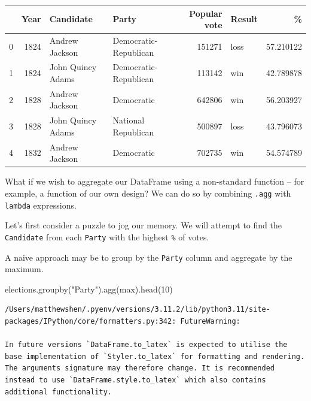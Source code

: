 \documentclass[
  letterpaper,
  DIV=11,
  numbers=noendperiod]{scrreprt}
\newenvironment{Shaded}{\begin{snugshade}}{\end{snugshade}}
\newcommand{\BuiltInTok}[1]{\textcolor[rgb]{0.00,0.23,0.31}{#1}}
\newcommand{\DecValTok}[1]{\textcolor[rgb]{0.68,0.00,0.00}{#1}}
\newcommand{\NormalTok}[1]{\textcolor[rgb]{0.00,0.23,0.31}{#1}}
\newcommand{\StringTok}[1]{\textcolor[rgb]{0.13,0.47,0.30}{#1}}
\begin{document}
\begin{tabular}{lrllrlr}
\toprule
{} &  Year &          Candidate &                  Party &  Popular vote & Result &          \% \\
\midrule
0 &  1824 &     Andrew Jackson &  Democratic-Republican &        151271 &   loss &  57.210122 \\
1 &  1824 &  John Quincy Adams &  Democratic-Republican &        113142 &    win &  42.789878 \\
2 &  1828 &     Andrew Jackson &             Democratic &        642806 &    win &  56.203927 \\
3 &  1828 &  John Quincy Adams &    National Republican &        500897 &   loss &  43.796073 \\
4 &  1832 &     Andrew Jackson &             Democratic &        702735 &    win &  54.574789 \\
\bottomrule
\end{tabular}

What if we wish to aggregate our DataFrame using a non-standard function
-- for example, a function of our own design? We can do so by combining
\texttt{.agg} with \texttt{lambda} expressions.

Let's first consider a puzzle to jog our memory. We will attempt to find
the \texttt{Candidate} from each \texttt{Party} with the highest
\texttt{\%} of votes.

A naive approach may be to group by the \texttt{Party} column and
aggregate by the maximum.

\begin{Shaded}
\begin{Highlighting}[]
\NormalTok{elections.groupby(}\StringTok{"Party"}\NormalTok{).agg(}\BuiltInTok{max}\NormalTok{).head(}\DecValTok{10}\NormalTok{)}
\end{Highlighting}
\end{Shaded}

\begin{verbatim}
/Users/matthewshen/.pyenv/versions/3.11.2/lib/python3.11/site-packages/IPython/core/formatters.py:342: FutureWarning:

In future versions `DataFrame.to_latex` is expected to utilise the base implementation of `Styler.to_latex` for formatting and rendering. The arguments signature may therefore change. It is recommended instead to use `DataFrame.style.to_latex` which also contains additional functionality.
\end{verbatim}
\end{document}
